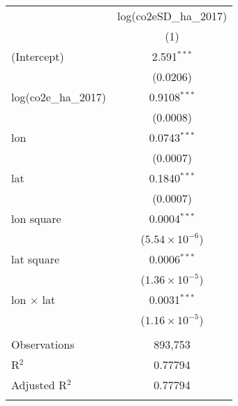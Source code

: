 
\begingroup
\centering
\begin{tabular}{lc}
   \tabularnewline\midrule\midrule
                         & log(co2eSD\_ha\_2017)\\    
                         & (1)\\  
   \midrule 
   (Intercept)           & 2.591$^{***}$\\   
                         & (0.0206)\\   
   log(co2e\_ha\_2017)   & 0.9108$^{***}$\\   
                         & (0.0008)\\   
   lon                   & 0.0743$^{***}$\\   
                         & (0.0007)\\   
   lat                   & 0.1840$^{***}$\\   
                         & (0.0007)\\   
   lon square            & 0.0004$^{***}$\\   
                         & ($5.54\times 10^{-6}$)\\    
   lat square            & 0.0006$^{***}$\\   
                         & ($1.36\times 10^{-5}$)\\    
   lon $\times$ lat      & 0.0031$^{***}$\\   
                         & ($1.16\times 10^{-5}$)\\    
    \\
   Observations          & 893,753\\  
   R$^2$                 & 0.77794\\  
   Adjusted R$^2$        & 0.77794\\  
   \midrule \midrule & \tabularnewline
\end{tabular}
\par\endgroup


